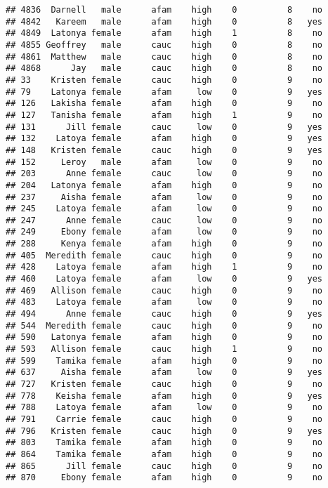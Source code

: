 \documentclass[
]{article}
\begin{document}
\begin{verbatim}
## 4836  Darnell   male      afam    high    0          8    no
## 4842   Kareem   male      afam    high    0          8   yes
## 4849  Latonya female      afam    high    1          8    no
## 4855 Geoffrey   male      cauc    high    0          8    no
## 4861  Matthew   male      cauc    high    0          8    no
## 4868      Jay   male      cauc    high    0          8    no
## 33    Kristen female      cauc    high    0          9    no
## 79    Latonya female      afam     low    0          9   yes
## 126   Lakisha female      afam    high    0          9    no
## 127   Tanisha female      afam    high    1          9    no
## 131      Jill female      cauc     low    0          9   yes
## 132    Latoya female      afam    high    0          9   yes
## 148   Kristen female      cauc    high    0          9   yes
## 152     Leroy   male      afam     low    0          9    no
## 203      Anne female      cauc     low    0          9    no
## 204   Latonya female      afam    high    0          9    no
## 237     Aisha female      afam     low    0          9    no
## 245    Latoya female      afam     low    0          9    no
## 247      Anne female      cauc     low    0          9    no
## 249     Ebony female      afam     low    0          9    no
## 288     Kenya female      afam    high    0          9    no
## 405  Meredith female      cauc    high    0          9    no
## 428    Latoya female      afam    high    1          9    no
## 460    Latoya female      afam     low    0          9   yes
## 469   Allison female      cauc    high    0          9    no
## 483    Latoya female      afam     low    0          9    no
## 494      Anne female      cauc    high    0          9   yes
## 544  Meredith female      cauc    high    0          9    no
## 590   Latonya female      afam    high    0          9    no
## 593   Allison female      cauc    high    1          9    no
## 599    Tamika female      afam    high    0          9    no
## 637     Aisha female      afam     low    0          9   yes
## 727   Kristen female      cauc    high    0          9    no
## 778    Keisha female      afam    high    0          9   yes
## 788    Latoya female      afam     low    0          9    no
## 791    Carrie female      cauc    high    0          9    no
## 796   Kristen female      cauc    high    0          9   yes
## 803    Tamika female      afam    high    0          9    no
## 864    Tamika female      afam    high    0          9    no
## 865      Jill female      cauc    high    0          9    no
## 870     Ebony female      afam    high    0          9    no

\end{verbatim}
\end{document}
